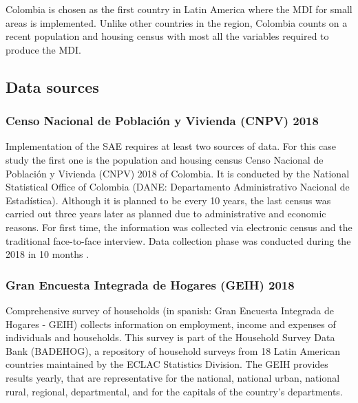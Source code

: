 \documentclass[a4paper, 11pt]{article}
\begin{document}
Colombia is chosen as the first country in Latin America where the MDI for small areas is implemented. Unlike other countries in the region, Colombia counts on a recent population and housing census with most all the variables required to produce the MDI. 



\subsection{Data sources}

\subsubsection{Censo Nacional de Población y Vivienda (CNPV)  2018}
Implementation of the SAE requires at least two sources of data. For this case study the first one is the population and housing census Censo Nacional de Población y Vivienda (CNPV) 2018 of Colombia. It is conducted by the National Statistical Office of Colombia (DANE: Departamento Administrativo Nacional de Estadística). Although it is planned to be every 10 years, the last census was carried out three years later as planned due to administrative and economic reasons. For first time, the information was collected via electronic census and the traditional face-to-face interview. Data collection phase was conducted during the 2018 in 10 months \citep{DANE2019}.


\subsubsection{Gran Encuesta Integrada de Hogares (GEIH) 2018}

Comprehensive survey of households (in spanish: Gran Encuesta Integrada de Hogares - GEIH) collects information on employment, income and expenses of individuals and households. This survey is part of the Household Survey Data Bank (BADEHOG), a repository of household surveys from 18 Latin American countries maintained by the ECLAC Statistics Division.  The GEIH provides results yearly, that are representative for the national, national urban, national rural, regional, departmental, and for the capitals of the country's departments.  
    

    
\end{document}
